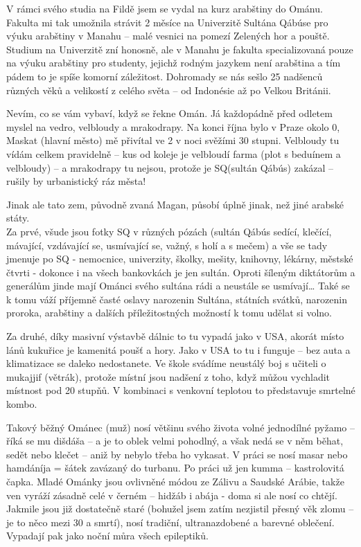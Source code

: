 V rámci svého studia na Fildě jsem se vydal na kurz arabštiny do Ománu. Fakulta mi tak umožnila strávit 2 měsíce na Univerzitě Sultána Qábúse pro výuku arabštiny v Manahu – malé vesnici na pomezí Zelených hor a pouště. Studium na Univerzitě zní honosně, ale v Manahu je fakulta specializovaná pouze na výuku arabštiny pro studenty, jejichž rodným jazykem není arabština a tím pádem to je spíše komorní záležitost. Dohromady se nás sešlo 25 nadšenců různých věků a velikostí z celého světa – od Indonésie až po Velkou Británii. 

Nevím, co se vám vybaví, když se řekne Omán. Já každopádně před odletem myslel na vedro, velbloudy a mrakodrapy. Na konci října bylo v Praze okolo 0, Maskat (hlavní město) mě přivítal ve 2 v noci svěžími 30 stupni. Velbloudy tu vídám celkem pravidelně – kus od koleje je velbloudí farma (plot s beduínem a velbloudy) – a mrakodrapy tu nejsou, protože je SQ(sultán Qábús) zakázal – rušily by urbanistický ráz města! 

Jinak ale tato zem, původně zvaná Magan, působí úplně jinak, než jiné arabské státy. \\
Za prvé, všude jsou fotky SQ v různých pózách (sultán Qábús sedící, klečící, mávající, vzdávající se, usmívající se, važný, s holí a s mečem) a vše se tady jmenuje po SQ  - nemocnice, univerzity, školky, mešity, knihovny, lékárny, městské čtvrti - dokonce i na všech bankovkách je jen sultán. Oproti šíleným diktátorům a generálům jinde mají Ománci svého sultána rádi a neustále se usmívají… Také se k tomu váží příjemně časté oslavy narozenin Sultána, státních svátků, narozenin proroka, arabštiny a dalších příležitostných možností k tomu udělat si volno.

Za druhé, díky masivní výstavbě dálnic to tu vypadá jako v USA, akorát místo lánů kukuřice je kamenitá poušť a hory. Jako v USA to tu i funguje – bez auta a klimatizace se daleko nedostanete. Ve škole svádíme neustálý boj s učiteli o mukajjif (větrák), protože místní jsou nadšení z toho, když můžou vychladit místnost pod 20 stupňů. V kombinaci s venkovní teplotou to představuje smrtelné kombo.

Takový běžný Ománec (muž) nosí většinu svého života volné jednodílné pyžamo – říká se mu dišdáša – a je to oblek velmi pohodlný, a však nedá se v něm běhat, sedět nebo klečet – aniž by nebylo třeba ho vykasat. V práci se nosí masar nebo hamdáníja = šátek zavázaný do turbanu. Po práci už jen kumma – kastrolovitá čapka. Mladé Ománky jsou ovlivněné módou ze Zálivu a Saudské Arábie, takže ven vyráží zásadně celé v černém – hidžáb i abája - doma si ale nosí co chtějí. Jakmile jsou již dostatečně staré (bohužel jsem zatím nezjistil přesný věk zlomu – je to něco mezi 30 a smrtí), nosí tradiční, ultranazdobené a barevné oblečení. Vypadají pak jako noční můra všech epileptiků.


